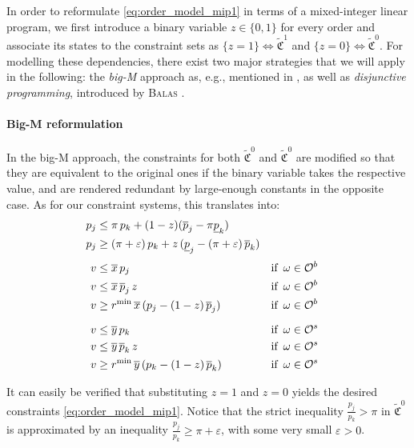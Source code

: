 \documentclass[11pt,parskip=full]{scrartcl}%
\newcommand*{\eg}{e.g., }
\newcommand*{\Min}{\mathrm{min}}
\newcommand*{\buyorders}{\mathcal{O}^b}     %
\newcommand*{\sellorders}{\mathcal{O}^s}    %
\begin{document}
In order to reformulate \eqref{eq:order_model_mip1} in terms of a mixed-integer linear program,
we first introduce a binary variable $ z \in \{0,1\} $ for every order and associate its states to
the constraint sets as $ \{z = 1\} \Leftrightarrow \tilde{\mathfrak{C}}^1 $ and
$ \{z = 0\} \Leftrightarrow \tilde{\mathfrak{C}}^0 $.
For modelling these dependencies, there exist two major strategies that we will apply in the
following: the \emph{big-M} approach as, \eg mentioned in \cite{??}, as well as \emph{disjunctive
programming}, introduced by \textsc{Balas} \cite{balas:DP}.

\paragraph{Big-M reformulation}

In the big-M approach, the constraints for both $ \tilde{\mathfrak{C}}^0 $ and
$ \tilde{\mathfrak{C}}^0 $ are modified so that they are equivalent to the original ones if the
binary variable takes the respective value, and are rendered redundant by large-enough constants in
the opposite case.
As for our constraint systems, this translates into:
\begin{subequations}
\begin{align}
  p_j &\le \pi \, p_k + (1-z) (\overline{p}_j - \pi \underline{p}_k) \\
  p_j &\ge (\pi+\varepsilon) \, p_k
    + z \, (\underline{p}_j - (\pi+\varepsilon) \, \overline{p}_k) \\[1mm]
  v &\le \overline{x} \, p_j
    && \text{if} \enskip \omega \in \buyorders \\
  v &\le \overline{x} \, \overline{p}_j \, z
    && \text{if} \enskip \omega \in \buyorders \\
  v &\ge r^\Min \, \overline{x} \, (p_j - (1-z) \, \overline{p}_j)
    && \text{if} \enskip \omega \in \buyorders \\[2mm]
  v &\le \overline{y} \, p_k
    && \text{if} \enskip \omega \in \sellorders \\
  v &\le \overline{y} \, \overline{p}_k \, z
    && \text{if} \enskip \omega \in \sellorders \\
  v &\ge r^\Min \, \overline{y} \, (p_k - (1-z) \, \overline{p}_k)
    && \text{if} \enskip \omega \in \sellorders
\end{align}
\end{subequations}

It can easily be verified that substituting $ z=1 $ and $ z=0 $ yields the desired constraints
\eqref{eq:order_model_mip1}.
Notice that the strict inequality $ \frac{p_j}{p_k} > \pi $ in $ \tilde{\mathfrak{C}}^0 $ is
approximated by an inequality $ \frac{p_j}{p_k} \ge \pi + \varepsilon $, with some very small
$ \varepsilon > 0 $.
\end{document}

